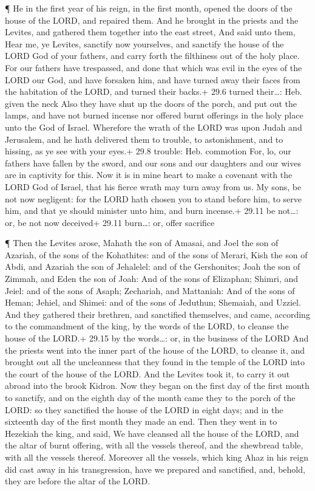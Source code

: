  ¶ He in the first year of his reign, in the first month,
opened the doors of the house of the LORD, and repaired them.
 And he brought in the priests and the Levites, and gathered
them together into the east street,  And said unto them,
Hear me, ye Levites, sanctify now yourselves, and sanctify the house of
the LORD God of your fathers, and carry forth the filthiness out of the
holy place.  For our fathers have trespassed, and done that
which was evil in the eyes of the LORD our God, and have forsaken him,
and have turned away their faces from the habitation of the LORD, and
turned their backs.+ 29.6 turned their\ldots: Heb. given the neck
 Also they have shut up the doors of the porch, and put out
the lamps, and have not burned incense nor offered burnt offerings in
the holy place unto the God of Israel.  Wherefore the wrath
of the LORD was upon Judah and Jerusalem, and he hath delivered them to
trouble, to astonishment, and to hissing, as ye see with your eyes.+
29.8 trouble: Heb. commotion  For, lo, our fathers have
fallen by the sword, and our sons and our daughters and our wives are in
captivity for this.  Now it is in mine heart to make a
covenant with the LORD God of Israel, that his fierce wrath may turn
away from us.  My sons, be not now negligent: for the LORD
hath chosen you to stand before him, to serve him, and that ye should
minister unto him, and burn incense.+ 29.11 be not\ldots: or, be not now
deceived+ 29.11 burn\ldots: or, offer sacrifice

 ¶ Then the Levites arose, Mahath the son of Amasai, and
Joel the son of Azariah, of the sons of the Kohathites: and of the sons
of Merari, Kish the son of Abdi, and Azariah the son of Jehalelel: and
of the Gershonites; Joah the son of Zimmah, and Eden the son of Joah:
 And of the sons of Elizaphan; Shimri, and Jeiel: and of
the sons of Asaph; Zechariah, and Mattaniah:  And of the
sons of Heman; Jehiel, and Shimei: and of the sons of Jeduthun;
Shemaiah, and Uzziel.  And they gathered their brethren,
and sanctified themselves, and came, according to the commandment of the
king, by the words of the LORD, to cleanse the house of the LORD.+ 29.15
by the words\ldots: or, in the business of the LORD  And
the priests went into the inner part of the house of the LORD, to
cleanse it, and brought out all the uncleanness that they found in the
temple of the LORD into the court of the house of the LORD. And the
Levites took it, to carry it out abroad into the brook Kidron.
 Now they began on the first day of the first month to
sanctify, and on the eighth day of the month came they to the porch of
the LORD: so they sanctified the house of the LORD in eight days; and in
the sixteenth day of the first month they made an end. 
Then they went in to Hezekiah the king, and said, We have cleansed all
the house of the LORD, and the altar of burnt offering, with all the
vessels thereof, and the shewbread table, with all the vessels thereof.
 Moreover all the vessels, which king Ahaz in his reign did
cast away in his transgression, have we prepared and sanctified, and,
behold, they are before the altar of the LORD.


